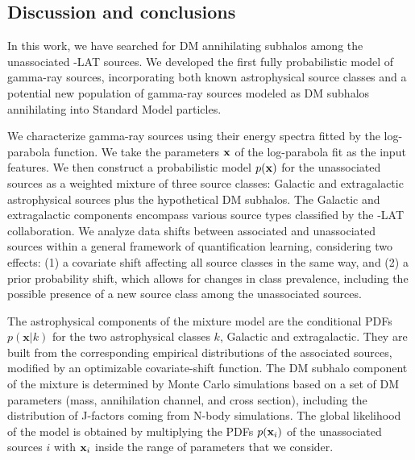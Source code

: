 \subsection{Discussion and conclusions}
\label{sec:halos:conclusions}
In this work, we have searched for DM annihilating subhalos among the unassociated \Fermi-LAT sources. We developed the first fully probabilistic model of gamma-ray sources, incorporating both known astrophysical source classes and a potential new population of gamma-ray sources modeled as DM subhalos annihilating into Standard Model particles. 

We characterize gamma-ray sources using their  energy spectra fitted by the log-parabola function.
We take the parameters $\bf x$ of the log-parabola fit as the input features. 
We then
construct a probabilistic model $p({\bf x})$ for the unassociated sources as a weighted mixture of three source classes: Galactic and extragalactic astrophysical sources plus the hypothetical DM subhalos. The Galactic and extragalactic components encompass various source types classified by the \Fermi-LAT collaboration. We analyze data shifts between associated and unassociated sources within a general framework of quantification learning, considering two effects: (1) a covariate shift affecting all source classes in the same way, and (2) a prior probability shift, which allows for changes in class prevalence, including the possible presence of a new source class among the unassociated sources.

The astrophysical components of the mixture model are the conditional PDFs $p(\mathbf{x}|k)$ for the two astrophysical classes $k$, Galactic and extragalactic.
They are built from the corresponding empirical distributions of the associated sources, modified by an optimizable covariate-shift function. The DM subhalo component of the mixture is determined by Monte Carlo simulations based on a set of DM parameters (mass, annihilation channel, and cross section), including the distribution of J-factors coming from N-body simulations. The global likelihood of the model is obtained by multiplying the PDFs $p({\bf x}_i)$ of the unassociated sources $i$ with ${\bf x}_i$ inside the range of parameters that we consider. 

